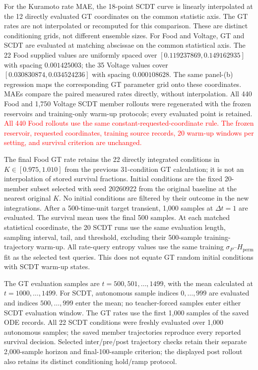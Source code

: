 \documentclass[10pt,a4paper]{article}
\begin{document}
For the Kuramoto rate MAE, the 18-point SCDT curve is linearly interpolated
at the 12 directly evaluated GT coordinates on the common statistic axis.
The GT rates are not interpolated or recomputed for this comparison.
These are distinct conditioning grids, not different ensemble sizes.
For Food and Voltage, GT and SCDT are evaluated at matching abscissae on
the common statistical axis. The 22 Food supplied values are uniformly
spaced over $[0.119237869,0.149162935]$ with spacing $0.001425003$;
the 35 Voltage values cover $[0.030830874,0.034524236]$ with spacing
$0.000108628$. The same panel-(b) regression maps the corresponding GT
parameter grid onto these coordinates. MAEs compare the paired measured
rates directly, without interpolation. All 440 Food and 1,750 Voltage
SCDT member rollouts were regenerated with the frozen reservoirs and
training-only warm-up protocols; every evaluated point is retained.
\textcolor{red}{All 440 Food rollouts use the same constant-requested-coordinate
rule. The frozen reservoir, requested coordinates, training source records,
20 warm-up windows per setting, and survival criterion are unchanged.}

The final Food GT rate retains the 22 directly integrated conditions in
$K\in[0.975,1.010]$ from the previous 31-condition GT calculation;
it is not an interpolation of stored survival fractions. Initial
conditions are the fixed 20-member subset selected with seed 20260922 from the
original baseline at the nearest original $K$. No initial conditions are
filtered by their outcome in the new integrations. After a 500-time-unit
target transient, 1,000 samples at $\Delta t=1$ are evaluated. The survival
mean uses the final 500 samples. At each matched statistical coordinate,
the 20 SCDT runs use the same evaluation length, sampling interval, tail,
and threshold, excluding their
500-sample training-trajectory warm-up. All rate-query entropy values use the
same training $\sigma_P$--$H_{\mathrm{perm}}$ fit as the selected test queries.
This does not equate GT random initial conditions with SCDT warm-up states.

The GT evaluation samples are $t=500,501,\ldots,1499$, with the mean
calculated at $t=1000,\ldots,1499$. For SCDT, autonomous sample indices
$0,\ldots,999$ are evaluated and indices $500,\ldots,999$ enter the mean;
no teacher-forced samples enter either SCDT evaluation window.
The GT rates use the first 1,000 samples of the saved ODE records.
All 22 SCDT conditions were freshly evaluated over 1,000 autonomous samples;
the saved member trajectories reproduce every reported survival decision.
Selected inter/pre/post trajectory checks retain their separate
2,000-sample horizon and final-100-sample criterion; the displayed post
rollout also retains its distinct conditioning hold/ramp protocol.
\end{document}
